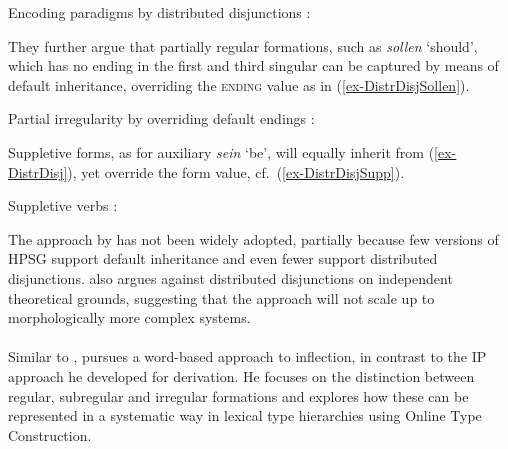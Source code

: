\documentclass[output=paper
	        ,collection
	        ,collectionchapter
 	        ,biblatex
                ,babelshorthands
                ,newtxmath
                ,draftmode
                ,colorlinks, citecolor=brown
]{langscibook}
\begin{document}
\ea
\label{ex-DistrDisj}
Encoding paradigms by distributed disjunctions \citep{Krieger:Nerbonne:93}:\addpages\\
\z  

They further argue that partially regular formations, such as
\textit{sollen} `should', which has no ending in the first and third
singular can be captured by means of default inheritance, overriding
the \textsc{ending} value as in (\ref{ex-DistrDisjSollen}).  

\ea
\label{ex-DistrDisjSollen}
Partial irregularity by overriding default endings \citep{Krieger:Nerbonne:93}:\addpages\\
\z

Suppletive forms, as for auxiliary \textit{sein} `be', will equally
inherit from (\ref{ex-DistrDisj}), yet override the form value,
cf.\ (\ref{ex-DistrDisjSupp}).  

\ea
\label{ex-DistrDisjSupp}
Suppletive verbs \citep{Krieger:Nerbonne:93}\addpages:\\
\z

The approach by \citet{Krieger:Nerbonne:93} has not been widely
adopted, partially because few versions of HPSG support default
inheritance and even fewer support distributed
disjunctions. \citet[176--178]{Koenig99} also argues against distributed
disjunctions on independent theoretical grounds, suggesting that the
approach will not scale up to morphologically more complex systems.  

\paragraph*{\citet{Koenig99}}

Similar to \citet{Krieger:Nerbonne:93}, \citet{Koenig99} pursues a
word-based approach to inflection, in contrast to the IP approach he
developed for derivation. He focuses on the distinction between
regular, subregular and irregular formations and explores how these
can be represented in a systematic way in lexical type hierarchies
using Online Type Construction.
\end{document}
